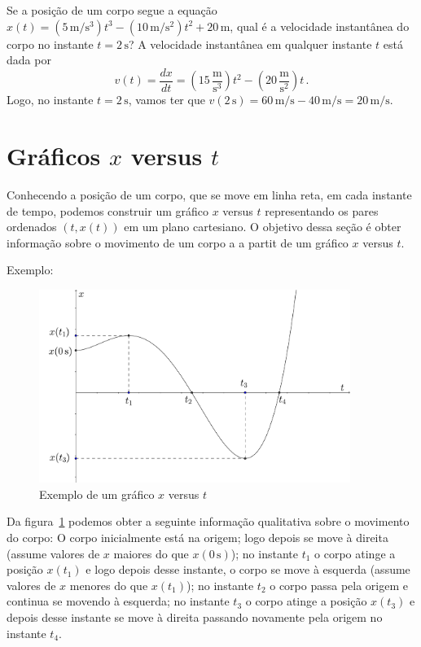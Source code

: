 \documentclass[12pt, a4paper]{article}
\newcommand{\dpar}[1]{\left(#1\right)}
\newcommand{\un}[1]{\mathrm{#1}}
\begin{document}
Se a posição de um corpo segue a equação $x(t)=(5\,\un m/\un{s}^3)t^3-(10\,\un m/\un{s}^2)t^2+20\,\un m$, qual é a velocidade instantânea do corpo no instante $t=2\,\un s$? A velocidade instantânea em qualquer instante $t$ está dada por
$$v(t)=\frac{dx}{dt}=\dpar{15\,\frac{\un m}{\un{s}^3}}t^2-\dpar{20\,\frac{\un m}{\un{s}^2}}t\,.$$
Logo, no instante $t=2\,\un s$, vamos ter que $v(2\,\un s)=60\,\un m/\un s-40\,\un m/\un s=20\,\un m/\un s$.

\section{Gráficos $x$ versus $t$}
Conhecendo a posição de um corpo, que se move em linha reta, em cada instante de tempo, podemos construir um gráfico $x$ versus $t$ representando os pares ordenados $(t,x(t))$ em um plano cartesiano. O objetivo dessa seção é obter informação sobre o movimento de um corpo a a partit de um gráfico $x$ versus $t$.

Exemplo:
\begin{figure}[ht]
  \centering
  \includegraphics[width=0.9\textwidth,keepaspectratio]{2-movimento-retilineo-fig1.pdf}
  \caption{Exemplo de um gráfico $x$ versus $t$}
  \label{fig1}
\end{figure}
Da figura~\ref{fig1} podemos obter a seguinte informação qualitativa sobre o movimento do corpo: O corpo inicialmente está na origem; logo depois se move à direita (assume valores de $x$ maiores do que $x(0\,\un s)$); no instante $t_1$ o corpo atinge a posição $x(t_1)$ e logo depois desse instante, o corpo se move à esquerda (assume valores de $x$ menores do que $x(t_1)$); no instante $t_2$ o corpo passa pela origem e continua se movendo à esquerda; no instante $t_3$ o corpo atinge a posição $x(t_3)$ e depois desse instante se move à direita passando novamente pela origem no instante $t_4$.
\end{document}
